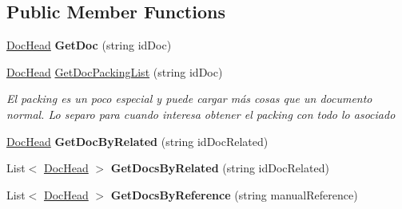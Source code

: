 \subsection*{Public Member Functions}
\begin{DoxyCompactItemize}
\item 
\mbox{\label{class_h_k_supply_1_1_services_1_1_implementations_1_1_e_f_supply_docs_a0d08519e2f9c127b2eb064c7cf964e5d}} 
\mbox{\hyperlink{class_h_k_supply_1_1_models_1_1_supply_1_1_doc_head}{Doc\+Head}} {\bfseries Get\+Doc} (string id\+Doc)
\item 
\mbox{\hyperlink{class_h_k_supply_1_1_models_1_1_supply_1_1_doc_head}{Doc\+Head}} \mbox{\hyperlink{class_h_k_supply_1_1_services_1_1_implementations_1_1_e_f_supply_docs_acc782dbf38c03242efdcbfd2e49f31e5}{Get\+Doc\+Packing\+List}} (string id\+Doc)
\begin{DoxyCompactList}\small\item\em El packing es un poco especial y puede cargar más cosas que un documento normal. Lo separo para cuando interesa obtener el packing con todo lo asociado \end{DoxyCompactList}\item 
\mbox{\label{class_h_k_supply_1_1_services_1_1_implementations_1_1_e_f_supply_docs_a21e0ea74ffc13e260e91811c90d10005}} 
\mbox{\hyperlink{class_h_k_supply_1_1_models_1_1_supply_1_1_doc_head}{Doc\+Head}} {\bfseries Get\+Doc\+By\+Related} (string id\+Doc\+Related)
\item 
\mbox{\label{class_h_k_supply_1_1_services_1_1_implementations_1_1_e_f_supply_docs_af2bf5689815967809440fd64b8de7660}} 
List$<$ \mbox{\hyperlink{class_h_k_supply_1_1_models_1_1_supply_1_1_doc_head}{Doc\+Head}} $>$ {\bfseries Get\+Docs\+By\+Related} (string id\+Doc\+Related)
\item 
\mbox{\label{class_h_k_supply_1_1_services_1_1_implementations_1_1_e_f_supply_docs_af806670684c64f878f23491575a1fa9e}} 
List$<$ \mbox{\hyperlink{class_h_k_supply_1_1_models_1_1_supply_1_1_doc_head}{Doc\+Head}} $>$ {\bfseries Get\+Docs\+By\+Reference} (string manual\+Reference)

\end{DoxyCompactItemize}
